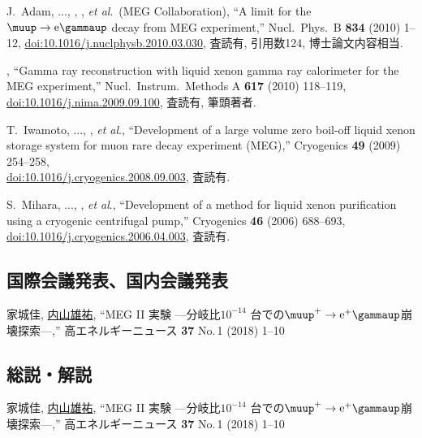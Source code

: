 \begin{enumerate}
J.~Adam, ..., \me, ,  {\it et al}.\ (MEG Collaboration),
``A limit for the $\meg$ decay from MEG experiment,''
Nucl.\ Phys.\ B \textbf{834} (2010) 1--12,
\href{https://doi.org/10.1016/j.nuclphysb.2010.03.030}{doi:10.1016/j.nuclphysb.2010.03.030},
査読有, 引用数124, 博士論文内容相当.

\me, ``Gamma ray reconstruction with liquid xenon gamma ray calorimeter for the MEG experiment,''
Nucl.\ Instrum.\ Methods A \textbf{617} (2010) 118--119,
\href{https://doi.org/10.1016/j.nima.2009.09.100}{doi:10.1016/j.nima.2009.09.100},
査読有, 筆頭著者.

T.~Iwamoto, ..., \me,  {\it et al}.,  %
``Development of a large volume zero boil-off liquid xenon storage system for muon rare decay experiment (MEG),''
Cryogenics \textbf{49} (2009) 254--258,\\
\href{https://doi.org/10.1016/j.cryogenics.2008.09.003}{doi:10.1016/j.cryogenics.2008.09.003},
査読有.

S.~Mihara, ..., \me,  {\it et al}., %
``Development of a method for liquid xenon purification using a cryogenic centrifugal pump,''
Cryogenics \textbf{46} (2006) 688--693,
\href{https://doi.org/10.1016/j.cryogenics.2006.04.003}{doi:10.1016/j.cryogenics.2006.04.003},
査読有.

\end{enumerate}



\subsection{国際会議発表、国内会議発表}
\begin{enumerate}
\setcounter{enumi}{30}
	\setlength{\itemsep}{-1pt}
  家城佳, \underline{内山雄祐},
  ``MEG II 実験 ---分岐比$10^{-14}$ 台での$\megc$崩壊探索---,''
  高エネルギーニュース {\bf 37} No.\,1 (2018) 1--10
\end{enumerate}

\subsection{総説・解説}
\begin{enumerate}
\setcounter{enumi}{30}
	\setlength{\itemsep}{-1pt}
  家城佳, \underline{内山雄祐},
  ``MEG II 実験 ---分岐比$10^{-14}$ 台での$\megc$崩壊探索---,''
  高エネルギーニュース {\bf 37} No.\,1 (2018) 1--10
\end{enumerate}

